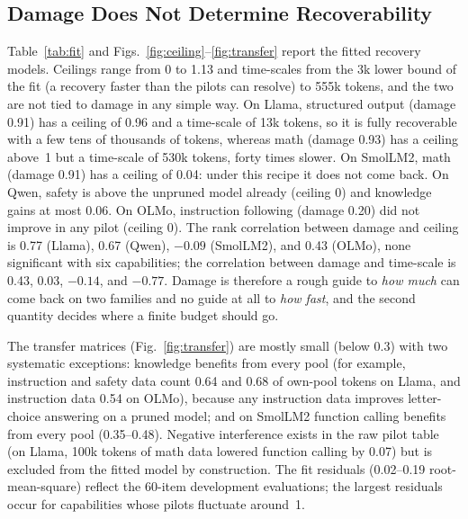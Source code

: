 \documentclass{ieeeaccess}
\begin{document}
\subsection{Damage Does Not Determine Recoverability}
\label{sec:recoverability}
Table~\ref{tab:fit} and Figs.~\ref{fig:ceiling}--\ref{fig:transfer} report the fitted recovery models. Ceilings range from 0 to 1.13 and time-scales from the 3k lower bound of the fit (a recovery faster than the pilots can resolve) to 555k tokens, and the two are not tied to damage in any simple way. On Llama, structured output (damage 0.91) has a ceiling of 0.96 and a time-scale of 13k tokens, so it is fully recoverable with a few tens of thousands of tokens, whereas math (damage 0.93) has a ceiling above~1 but a time-scale of 530k tokens, forty times slower. On SmolLM2, math (damage 0.91) has a ceiling of 0.04: under this recipe it does not come back. On Qwen, safety is above the unpruned model already (ceiling 0) and knowledge gains at most 0.06. On OLMo, instruction following (damage 0.20) did not improve in any pilot (ceiling 0). The rank correlation between damage and ceiling is 0.77 (Llama), 0.67 (Qwen), $-0.09$ (SmolLM2), and 0.43 (OLMo), none significant with six capabilities; the correlation between damage and time-scale is 0.43, 0.03, $-0.14$, and $-0.77$. Damage is therefore a rough guide to \emph{how much} can come back on two families and no guide at all to \emph{how fast}, and the second quantity decides where a finite budget should go.

The transfer matrices (Fig.~\ref{fig:transfer}) are mostly small (below 0.3) with two systematic exceptions: knowledge benefits from every pool (for example, instruction and safety data count 0.64 and 0.68 of own-pool tokens on Llama, and instruction data 0.54 on OLMo), because any instruction data improves letter-choice answering on a pruned model; and on SmolLM2 function calling benefits from every pool (0.35--0.48). Negative interference exists in the raw pilot table (on Llama, 100k tokens of math data lowered function calling by 0.07) but is excluded from the fitted model by construction. The fit residuals (0.02--0.19 root-mean-square) reflect the 60-item development evaluations; the largest residuals occur for capabilities whose pilots fluctuate around~1.

\begin{table}[t]
\caption{Fitted recovery models on the development split: damage, recovery ceiling $a_c$, time-scale $\tau_c$ (thousands of own-pool tokens; 3 is the lower bound of the fit and means faster than the pilots can resolve; n/a when the ceiling is zero), fit residual, and Spearman correlations between damage and the fitted quantities (six capabilities, none significant).}
\label{tab:fit}
\centering\footnotesize

\end{table}
\end{document}
